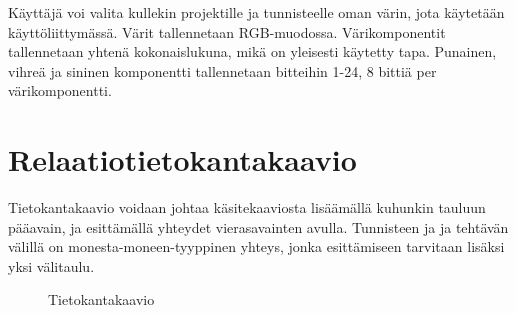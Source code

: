 \documentclass[12pt,a4paper,oneside,titlepage,pdftex]{article}
\begin{document}
Käyttäjä voi valita kullekin projektille ja tunnisteelle oman värin, jota käytetään käyttöliittymässä. Värit tallennetaan RGB-muodossa. Värikomponentit tallennetaan yhtenä kokonaislukuna, mikä on yleisesti käytetty tapa. Punainen, vihreä ja sininen komponentti tallennetaan bitteihin 1-24, 8 bittiä per värikomponentti.

\section{Relaatiotietokantakaavio}

Tietokantakaavio voidaan johtaa käsitekaaviosta lisäämällä kuhunkin tauluun pääavain, ja esittämällä yhteydet vierasavainten avulla. Tunnisteen ja ja tehtävän välillä on monesta\hyp{}moneen\hyp{}tyyppinen yhteys, jonka esittämiseen tarvitaan lisäksi yksi välitaulu.

\begin{figure}[htbp]
\begin{center}
\caption{Tietokantakaavio}
\label{tietokantakaavio}
\end{center}
\end{figure}
\end{document}
